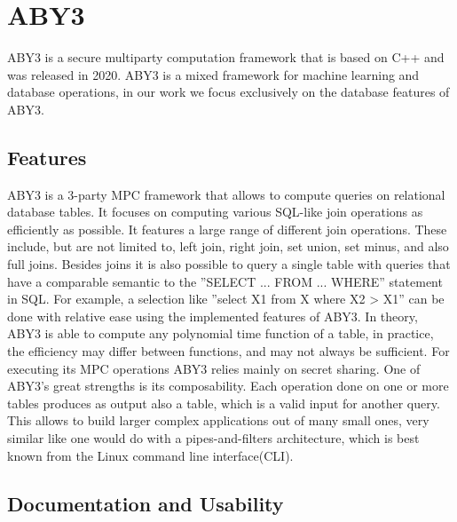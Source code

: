 \section{ABY3}
ABY3 \cite{mohassel2020fast} is a secure multiparty computation framework that is based on C++ and was released in 2020. ABY3 is a mixed framework for machine learning and database operations, in our work we focus exclusively on the database features of ABY3. 
\subsection{Features}
ABY3 is a 3-party MPC framework that allows to compute queries on relational database tables. It focuses on computing various SQL-like join operations as efficiently as possible. It features a large range of different join operations. These include, but are not limited to, left join, right join, set union, set minus, and also full joins.  
Besides joins it is also possible to query a single table with queries that have a comparable semantic to the ''SELECT ... FROM ... WHERE'' statement in SQL. For example, a selection like ''select X1 from X  where X2 > X1'' can be done with relative ease using the implemented features of ABY3. In theory, ABY3 is able to compute any polynomial time function of a table, in practice, the efficiency may differ between functions, and may not always be sufficient. For executing its MPC operations ABY3 relies mainly on secret sharing. 
One of ABY3's great strengths is its composability. 
Each operation done on one or more tables produces as output also a table, which is a valid input for another query. This allows to build larger complex applications out of many small ones, very similar like one would do with a pipes-and-filters architecture, which is best known from the Linux command line interface(CLI). 

\subsection{Documentation and Usability}
